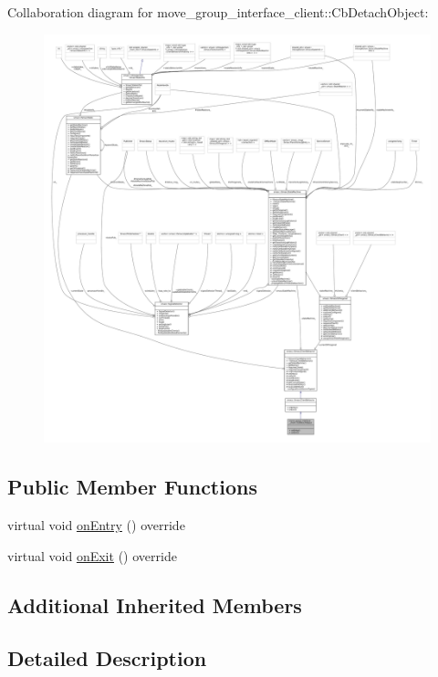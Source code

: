 Collaboration diagram for move\+\_\+group\+\_\+interface\+\_\+client\+:\+:Cb\+Detach\+Object\+:
\nopagebreak
\begin{figure}[H]
\begin{center}
\leavevmode
\includegraphics[width=350pt]{classmove__group__interface__client_1_1CbDetachObject__coll__graph}
\end{center}
\end{figure}
\subsection*{Public Member Functions}
\begin{DoxyCompactItemize}
\item 
virtual void \hyperlink{classmove__group__interface__client_1_1CbDetachObject_aaed049b8c346b38a82acb4641aa90df6}{on\+Entry} () override
\item 
virtual void \hyperlink{classmove__group__interface__client_1_1CbDetachObject_a43c672ede95c7dc49f98b5b7b623c43f}{on\+Exit} () override
\end{DoxyCompactItemize}
\subsection*{Additional Inherited Members}


\subsection{Detailed Description}


